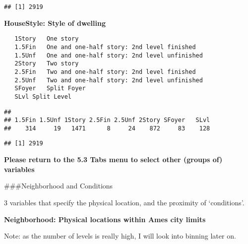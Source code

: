 \documentclass[]{article}
\newenvironment{Shaded}{\begin{snugshade}}{\end{snugshade}}
\newcommand{\CommentTok}[1]{\textcolor[rgb]{0.56,0.35,0.01}{\textit{#1}}}
\newcommand{\KeywordTok}[1]{\textcolor[rgb]{0.13,0.29,0.53}{\textbf{#1}}}
\newcommand{\NormalTok}[1]{#1}
\newcommand{\OperatorTok}[1]{\textcolor[rgb]{0.81,0.36,0.00}{\textbf{#1}}}
\newcommand{\StringTok}[1]{\textcolor[rgb]{0.31,0.60,0.02}{#1}}
\begin{document}
\begin{verbatim}
## [1] 2919
\end{verbatim}

\textbf{HouseStyle: Style of dwelling}

\begin{verbatim}
   1Story   One story
   1.5Fin   One and one-half story: 2nd level finished
   1.5Unf   One and one-half story: 2nd level unfinished
   2Story   Two story
   2.5Fin   Two and one-half story: 2nd level finished
   2.5Unf   Two and one-half story: 2nd level unfinished
   SFoyer   Split Foyer
   SLvl Split Level
\end{verbatim}

\begin{Shaded}
\end{Shaded}

\begin{verbatim}
## 
## 1.5Fin 1.5Unf 1Story 2.5Fin 2.5Unf 2Story SFoyer   SLvl 
##    314     19   1471      8     24    872     83    128
\end{verbatim}

\begin{Shaded}
\end{Shaded}

\begin{verbatim}
## [1] 2919
\end{verbatim}

\textbf{Please return to the 5.3 Tabs menu to select other (groups of)
variables}

\#\#\#Neighborhood and Conditions

3 variables that specify the physical location, and the proximity of
`conditions'.

\textbf{Neighborhood: Physical locations within Ames city limits}

Note: as the number of levels is really high, I will look into binning
later on.
\end{document}
